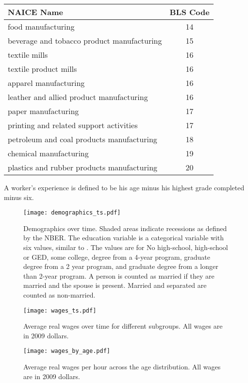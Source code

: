 \documentclass[11pt]{article}
\begin{document}
\begin{center}
\begin{tabular}{lc} \toprule
NAICE Name                                  & BLS Code \\ \midrule
food manufacturing                          &  14      \\
beverage and tobacco product manufacturing  &  15      \\
textile mills                               &  16      \\
textile product mills                       &  16      \\
apparel manufacturing                       &  16      \\
leather and allied product manufacturing    &  16      \\
paper manufacturing                         &  17      \\
printing and related support activities     &  17      \\
petroleum and coal products manufacturing   &  18      \\
chemical manufacturing                      &  19      \\
plastics and rubber products manufacturing  &  20      \\
\end{tabular}
\end{center}

A worker's experience is defined to be his age minus his highest grade completed minus six.

\begin{figure}
\begin{center}
  \texttt{[image: demographics\_ts.pdf]}
  \caption{
            Demographics over time. Shaded areas indicate recessions as defined by the NBER.
            The education variable is a categorical variable with six values, similar to \cite{jaeger_1997}.
            The values are for No high-school, high-school or GED, some college, degree from a 4-year program,
            graduate degree from a 2 year program, and graduate degree from a longer than 2-year program.
            A person is counted as married if they are married and the spouse is present. Married and separated
            are counted as non-married.
          }
  \label{fig:demographics_ts}
\end{center}
\end{figure}

\begin{figure}
\begin{center}
  \texttt{[image: wages\_ts.pdf]}
  \caption{
            Average real wages over time for different subgroups. All wages are in 2009 dollars.
          }
  \label{fig:wages_ts}
\end{center}
\end{figure}

\begin{figure}
\begin{center}
  \texttt{[image: wages\_by\_age.pdf]}
  \caption{
            Average real wages per hour across the age distribution. All wages are in 2009 dollars.
          }
  \label{fig:wages_by_age}
\end{center}
\end{figure}
\end{document}

